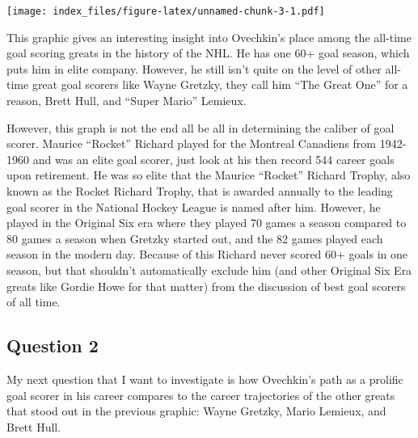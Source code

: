 \documentclass[
]{article}
\begin{document}
\texttt{[image: index\_files/figure-latex/unnamed-chunk-3-1.pdf]}

This graphic gives an interesting insight into Ovechkin's place among
the all-time goal scoring greats in the history of the NHL. He has one
60+ goal season, which puts him in elite company. However, he still
isn't quite on the level of other all-time great goal scorers like Wayne
Gretzky, they call him ``The Great One'' for a reason, Brett Hull, and
``Super Mario'' Lemieux.

However, this graph is not the end all be all in determining the caliber
of goal scorer. Maurice ``Rocket'' Richard played for the Montreal
Canadiens from 1942-1960 and was an elite goal scorer, just look at his
then record 544 career goals upon retirement. He was so elite that the
Maurice ``Rocket'' Richard Trophy, also known as the Rocket Richard
Trophy, that is awarded annually to the leading goal scorer in the
National Hockey League is named after him. However, he played in the
Original Six era where they played 70 games a season compared to 80
games a season when Gretzky started out, and the 82 games played each
season in the modern day. Because of this Richard never scored 60+ goals
in one season, but that shouldn't automatically exclude him (and other
Original Six Era greats like Gordie Howe for that matter) from the
discussion of best goal scorers of all time.

\hypertarget{question-2}{%
\subsection{Question 2}\label{question-2}}

My next question that I want to investigate is how Ovechkin's path as a
prolific goal scorer in his career compares to the career trajectories
of the other greats that stood out in the previous graphic: Wayne
Gretzky, Mario Lemieux, and Brett Hull.
\end{document}
